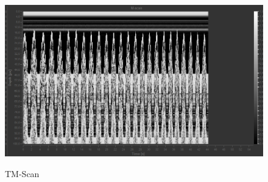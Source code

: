 \begin{figure}
	\centering
	\caption{TM-Scan}
	\includegraphics[width=\linewidth-40pt,height=\textheight-40pt,keepaspectratio]{content/images/TM-Scan.jpg}
	\label{fig:TM-Scan}
\end{figure}